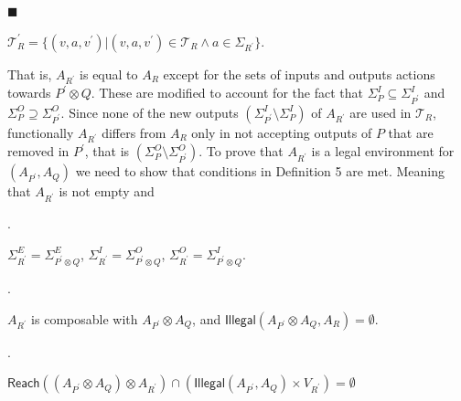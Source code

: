 \documentclass[10pt,a4paper]{article}
\begin{document}
 
 
\par\noindent  $\blacksquare$ 
 
$\mathcal{T}^{\prime}_{R}=\{(v,a,v^{\prime})|(v,a,v^{\prime})\in\mathcal{T}_{R}\land a\in\Sigma_{R^{\prime}}\}$.\par
 
 
  
 
 
That is, $A_{R^{\prime}}$ is equal to $A_{R}$ except for the sets of inputs and outputs actions towards $P^{\prime}\otimes Q$. These are modified to account for the fact that $\Sigma_{P}^{I}\subseteq\Sigma_{P^{\prime}}^{I}$ and $\Sigma_{P}^{O}\supseteq\Sigma_{P^{\prime}}^{O}$. Since none of the new outputs $(\Sigma_{P^{\prime}}^{I}\setminus\Sigma_{P}^{I})$ of $A_{R^{\prime}}$ are used in $\mathcal{T}_{R}$, functionally $A_{R^{\prime}}$ differs from $A_{R}$ only in not accepting outputs of $P$ that are removed in $P^{\prime}$, that is $(\Sigma_{P}^{O}\setminus\Sigma_{P^{\prime}}^{O})$. To prove that $A_{R^{\prime}}$ is a legal environment for $(A_{P^{\prime}},A_{Q})$ we need to show that conditions in Definition 5 are met. Meaning that $A_{R^{\prime}}$ is not empty and\par
  
\par{}. 
 
$\Sigma_{R^{\prime}}^{E}=\Sigma_{P^{\prime}\otimes Q}^{E}$, $\Sigma_{R^{\prime}}^{I}=\Sigma_{P^{\prime}\otimes Q}^{O}$, $\Sigma_{R^{\prime}}^{O}=\Sigma_{P^{\prime}\otimes Q}^{I}$.\par
 
 
 
\par{}. 
 
$A_{R^{\prime}}$ is composable with $A_{P^{\prime}}\otimes A_{Q}$, and $\mathsf{Illegal}(A_{P^{\prime}}\otimes A_{Q},A_{R})=\emptyset$.\par
 
 
 
\par{}. 
 
$\mathsf{Reach}((A_{P^{\prime}}\otimes A_{Q})\otimes A_{R^{\prime}})\cap(\mathsf{Illegal}(A_{P^{\prime}},A_{Q})\times V_{R^{\prime}})=\emptyset$\par
 
\end{document}
